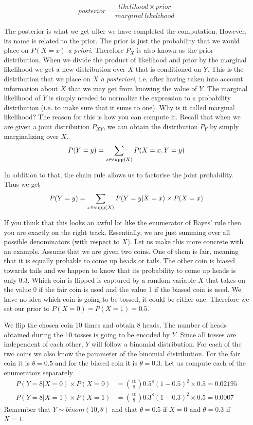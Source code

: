 $$ \mathit{posterior} = \dfrac{\mathit{likelihood} \times \mathit{prior}}{\mathit{marginal~likelihood}} $$

The posterior is what we get after we have completed the computation. However, its name is related to the prior.
The prior is just the probability that we would place on $ P(X=x) $ \textit{a priori}. Therefore $ P_{X} $
is also known as the prior distribution. When we divide the product of likelihood and prior by the 
marginal likelihood we get a new distribution
over $ X $ that is conditioned on $ Y $. This is the distribution that we place on $ X $ \textit{a posteriori}, i.e.
after having taken into account information about $ X $ that we may get from knowing the value of $ Y $. The marginal
likelihood of $ Y $ is simply needed to normalize the expression to a probability distribution (i.e. to make sure that
it sums to one). Why is it called marginal likelihood? The reason for this is how you can compute it. Recall that when
we are given a joint distribution $ P_{XY} $, we can obtain the distribution
$ P_{Y} $ by simply marginalizing over $ X $.
\begin{equation}
P(Y=y) = \sum_{x \in \operatorname{supp}(X)}P(X=x, Y=y)
\end{equation}

In addition to that, the chain rule allows us to factorise the joint probability. Thus we get
\begin{equation}
P(Y=y) = \sum_{x \in \operatorname{supp}(X)} P(Y=y|X=x) \times P(X=x)
\end{equation}

If you think that this looks an awful lot like the enumerator of Bayes' rule then you are exactly on the right track.
Essentially, we are just summing over all possible denominators (with respect to $ X $). Let us make this more
concrete with an example. Assume that we are given two coins. One of them is fair, meaning that it is equally probable
to come up heads or tails. The other coin is biased towards tails and we happen to know that its probability to come up
heads is only $ 0.3 $. Which coin is flipped is captured by a random variable $ X $ that takes on the value 0 if the
fair coin is used and the value 1 if the biased coin is used. We have no idea which coin is going to be tossed, it could
be either one. Therefore we set our prior to $ P(X=0) = P(X=1) = 0.5 $.

We flip the chosen coin 10 times and obtain 8 heads. The number of heads obtained during the 10 tosses is going
to be encoded by $ Y $. Since all tosses are independent of each other, $ Y $ will
follow a binomial distribution. For each of the two coins we also know the parameter of the binomial distribution.
For the fair coin it is $ \theta = 0.5 $ and for the biased coin it is $ \theta = 0.3 $. Let us compute each of the
enumerators separately.
\begin{align}
P(Y=8|X=0) \times P(X=0) &= \binom{10}{8} 0.5^8 (1-0.5)^2 \times 0.5 = 0.02195 \label{bayes1}\\
P(Y=8|X=1) \times P(X=1) &= \binom{10}{8} 0.3^8 (1-0.3)^2 \times 0.5 = 0.0007 \label{bayes2}
\end{align}
Remember that $ Y \sim binom(10,\theta) $ and that $ \theta=0.5 $ if $ X=0 $ and $ \theta=0.3 $ if $ X=1 $. 

